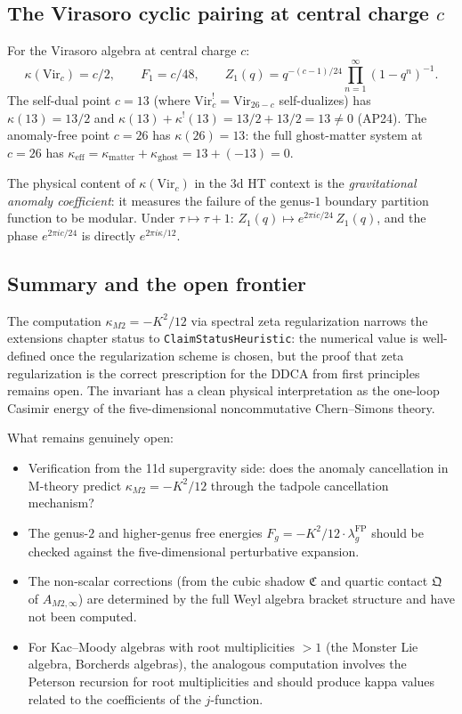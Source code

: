 \documentclass[11pt]{article}
\begin{document}
\subsection{The Virasoro cyclic pairing at central charge $c$}

For the Virasoro algebra at central charge $c$:
\[
\kappa(\mathrm{Vir}_c) = c/2, \qquad
F_1 = c/48, \qquad
Z_1(q) = q^{-(c-1)/24}\prod_{n=1}^\infty (1-q^n)^{-1}.
\]
The self-dual point $c = 13$ (where $\mathrm{Vir}_c^! =
\mathrm{Vir}_{26-c}$ self-dualizes) has
$\kappa(13) = 13/2$ and $\kappa(13) + \kappa^!(13) =
13/2 + 13/2 = 13 \neq 0$ (AP24).  The anomaly-free point
$c = 26$ has $\kappa(26) = 13$: the full ghost-matter system at
$c = 26$ has $\kappa_{\mathrm{eff}} = \kappa_{\mathrm{matter}} +
\kappa_{\mathrm{ghost}} = 13 + (-13) = 0$.

The physical content of $\kappa(\mathrm{Vir}_c)$ in the 3d HT
context is the \emph{gravitational anomaly coefficient}: it
measures the failure of the genus-$1$ boundary partition function
to be modular.  Under $\tau \mapsto \tau + 1$:
$Z_1(q) \mapsto e^{2\pi i c/24}\, Z_1(q)$, and the phase
$e^{2\pi i c/24}$ is directly $e^{2\pi i \kappa/12}$.

\subsection{Summary and the open frontier}

The computation $\kappa_{M2} = -K^2/12$ via spectral zeta
regularization narrows the extensions chapter status to
\texttt{ClaimStatusHeuristic}: the numerical value is
well-defined once the regularization scheme is chosen,
but the proof that zeta regularization is the correct
prescription for the DDCA from first principles remains open.
The invariant has a clean physical interpretation as the
one-loop Casimir energy of the five-dimensional noncommutative
Chern--Simons theory.

What remains genuinely open:
\begin{itemize}[nosep]
\item Verification from the 11d supergravity side: does the
  anomaly cancellation in M-theory predict $\kappa_{M2} = -K^2/12$
  through the tadpole cancellation mechanism?
\item The genus-$2$ and higher-genus free energies
  $F_g = -K^2/12 \cdot \lambda_g^{\mathrm{FP}}$ should be checked
  against the five-dimensional perturbative expansion.
\item The non-scalar corrections (from the cubic shadow
  $\mathfrak{C}$ and quartic contact $\mathfrak{Q}$ of
  $A_{M2,\infty}$) are determined by the full Weyl algebra
  bracket structure and have not been computed.
\item For Kac--Moody algebras with root multiplicities $> 1$
  (the Monster Lie algebra, Borcherds algebras), the analogous
  computation involves the Peterson recursion for root
  multiplicities and should produce kappa values related to
  the coefficients of the $j$-function.
\end{itemize}
\end{document}
